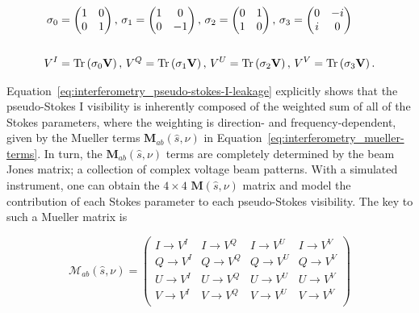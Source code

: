 \begin{equation}
\begin{split}
\sigma_0 &=\begin{pmatrix}1 & 0 \\0 & 1 \\ \end{pmatrix},\,
\sigma_1 = \begin{pmatrix} 1 & 0 \\ 0 & -1 \\ \end{pmatrix},\,
\sigma_2 = \begin{pmatrix} 0 & 1 \\ 1 & 0 \\ \end{pmatrix},\,
\sigma_3 = \begin{pmatrix} 0 & -i \\ i & 0 \\ \end{pmatrix} \\\\
V^I &= {\rm Tr}\left( \sigma_0\textbf{V} \right),\, V^Q= {\rm Tr}\left( \sigma_1\textbf{V} \right),\, V^U = {\rm Tr}\left( \sigma_2\textbf{V} \right),\, V^V = {\rm Tr}\left( \sigma_3\textbf{V} \right).
\end{split}
\end{equation}

Equation~\ref{eq:interferometry_pseudo-stokes-I-leakage} explicitly shows that the pseudo-Stokes I visibility is inherently composed of the weighted sum of all of the Stokes parameters, where the weighting is direction- and frequency-dependent, given by the Mueller terms  $\textbf{M}_{ab}(\hat{s},\nu)$ in Equation~\ref{eq:interferometry_mueller-terms}. In turn, the $\textbf{M}_{ab}(\hat{s},\nu)$ terms are completely determined by the beam Jones matrix; a collection of complex voltage beam patterns. With a simulated instrument, one can obtain the $4\times 4$ $\textbf{M}(\hat{s},\nu)$ matrix and model the contribution of each Stokes parameter to each pseudo-Stokes visibility. The key to such a Mueller matrix is

\begin{equation}
\mathcal{M}_{ab}(\hat{s},\nu) =
\begin{pmatrix}
I \rightarrow V^I & I \rightarrow V^Q & I \rightarrow V^U & I \rightarrow V^V\\
Q \rightarrow V^I  & Q \rightarrow V^Q & Q \rightarrow V^U & Q \rightarrow V^V\\
U \rightarrow V^I  & U \rightarrow V^Q & U \rightarrow V^U & U \rightarrow V^V\\
V \rightarrow V^I  & V \rightarrow V^Q & V \rightarrow V^U & V \rightarrow V^V\\
\end{pmatrix}
\label{eq:interferometry_Mab}
\end{equation}

